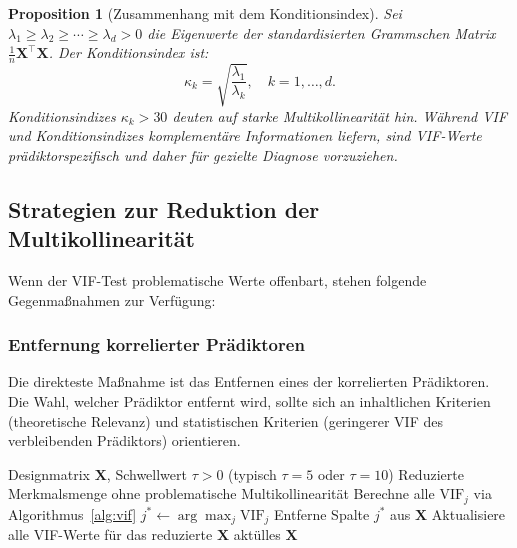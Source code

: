 ﻿\documentclass[12pt, a4paper]{article}
\newtheorem{proposition}[theorem]{Proposition}
\theoremstyle{definition}
\theoremstyle{remark}
\newcommand{\vX}{\bm{X}}
\newcommand{\T}{\top}
\begin{document}
\begin{proposition}[Zusammenhang mit dem Konditionsindex]
	Sei $\lambda_1 \geq \lambda_2 \geq \cdots \geq \lambda_d > 0$ die Eigenwerte der
	standardisierten Grammschen Matrix $\frac{1}{n}\vX^\T\vX$. Der \emph{Konditionsindex} ist:
	\[
	\kappa_k = \sqrt{\frac{\lambda_1}{\lambda_k}}, \quad k = 1, \ldots, d.
	\]
	Konditionsindizes $\kappa_k > 30$ deuten auf starke Multikollinearität hin. Während
	VIF und Konditionsindizes komplementäre Informationen liefern, sind VIF-Werte prädiktorspezifisch
	und daher für gezielte Diagnose vorzuziehen.
\end{proposition}

\subsection{Strategien zur Reduktion der Multikollinearität}

Wenn der VIF-Test problematische Werte offenbart, stehen folgende Gegenmaßnahmen zur Verfügung:

\subsubsection{Entfernung korrelierter Prädiktoren}

Die direkteste Maßnahme ist das Entfernen eines der korrelierten Prädiktoren. Die Wahl,
welcher Prädiktor entfernt wird, sollte sich an inhaltlichen Kriterien (theoretische Relevanz)
und statistischen Kriterien (geringerer VIF des verbleibenden Prädiktors) orientieren.

\begin{algorithm}[H]
	\caption{Iterative VIF-basierte Variablenselektion}
	\label{alg:vif_selection}
	\begin{algorithmic}[1]
		\Require Designmatrix $\vX$, Schwellwert $\tau > 0$ (typisch $\tau = 5$ oder $\tau = 10$)
		\Ensure Reduzierte Merkmalsmenge ohne problematische Multikollinearität
		\State Berechne alle $\mathrm{VIF}_j$ via Algorithmus~\ref{alg:vif}
		\State $j^* \leftarrow \arg\max_j \mathrm{VIF}_j$
		\State Entferne Spalte $j^*$ aus $\vX$
		\State Aktualisiere alle VIF-Werte für das reduzierte $\vX$
		\EndWhile
		\State \Return aktülles $\vX$
	\end{algorithmic}
\end{algorithm}
\end{document}
